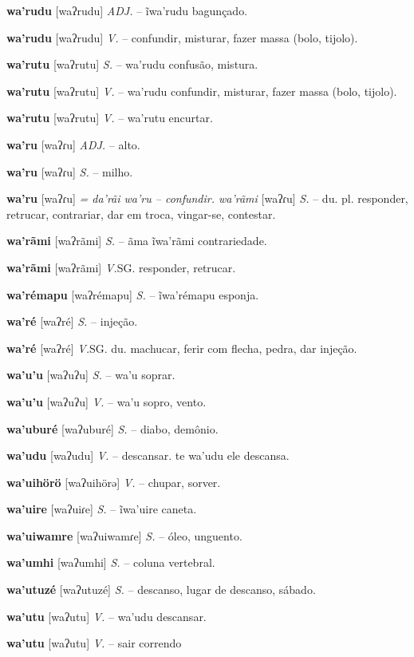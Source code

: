 {{{\textbf{wa'rudu} [waʔrudu] \textit{ADJ.} -- ĩwa'rudu bagunçado.

\textbf{wa'rudu} [waʔrudu] \textit{V.} -- confundir, misturar, fazer massa (bolo, tijolo).

\textbf{wa'rutu} [waʔrutu] \textit{S.} -- wa'rudu confusão, mistura.

\textbf{wa'rutu} [waʔrutu] \textit{V.} -- wa'rudu confundir, misturar, fazer massa (bolo, tijolo).

\textbf{wa'rutu} [waʔrutu] \textit{V.} -- wa'rutu encurtar.

\textbf{wa'ru} [waʔɾu] \textit{ADJ.} -- alto.

\textbf{wa'ru} [waʔɾu] \textit{S.} -- milho.

\textbf{wa'ru} [waʔɾu] \textit{= da'rãi wa'ru -- confundir. wa'rãmi} [waʔɾu] \textit{S.} -- du. pl. responder, retrucar, contrariar, dar em troca, vingar-se, contestar.

\textbf{wa'rãmi} [waʔrãmi] \textit{S.} -- ãma ĩwa'rãmi contrariedade.

\textbf{wa'rãmi} [waʔrãmi] \textit{V.}SG. responder, retrucar.

\textbf{wa'rémapu} [waʔrémapu] \textit{S.} -- ĩwa'rémapu esponja.

\textbf{wa'ré} [waʔré] \textit{S.} -- injeção.

\textbf{wa'ré} [waʔré] \textit{V.}SG. du. machucar, ferir com flecha, pedra, dar injeção.

\textbf{wa'u'u} [waʔuʔu] \textit{S.} -- wa'u soprar.

\textbf{wa'u'u} [waʔuʔu] \textit{V.} -- wa'u sopro, vento.

\textbf{wa'uburé} [waʔuburé] \textit{S.} -- diabo, demônio.

\textbf{wa'udu} [waʔudu] \textit{V.} -- descansar. te wa'udu ele descansa.

\textbf{wa'uihörö} [waʔuihörə] \textit{V.} -- chupar, sorver.

\textbf{wa'uire} [waʔuiɾe] \textit{S.} -- ĩwa'uire caneta.

\textbf{wa'uiwamre} [waʔuiwamɾe] \textit{S.} -- óleo, unguento.

\textbf{wa'umhi} [waʔumhi] \textit{S.} -- coluna vertebral.

\textbf{wa'utuzé} [waʔutuzé] \textit{S.} -- descanso, lugar de descanso, sábado.

\textbf{wa'utu} [waʔutu] \textit{V.} -- wa'udu descansar.

\textbf{wa'utu} [waʔutu] \textit{V.} -- {sair correndo}

}}}
